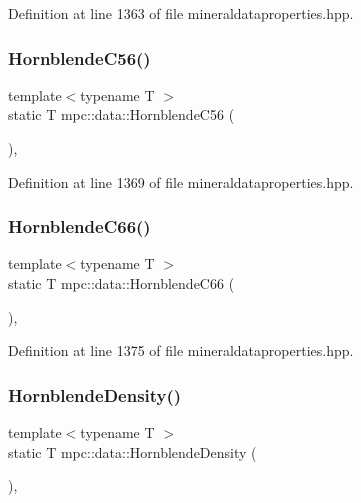 Definition at line 1363 of file mineraldataproperties.\+hpp.

\mbox{\label{namespacempc_1_1data_a4ffcdae75b9a2bb6129de78381f8be65}} 
\subsubsection{\texorpdfstring{Hornblende\+C56()}{HornblendeC56()}}
{\footnotesize\ttfamily template$<$typename T $>$ \\
static T mpc\+::data\+::\+Hornblende\+C56 (\begin{DoxyParamCaption}{ }\end{DoxyParamCaption})\hspace{0.3cm}{\ttfamily [inline]}, {\ttfamily [static]}}



Definition at line 1369 of file mineraldataproperties.\+hpp.

\mbox{\label{namespacempc_1_1data_a860769512fd43c6be02bb0b4a57c0f48}} 
\subsubsection{\texorpdfstring{Hornblende\+C66()}{HornblendeC66()}}
{\footnotesize\ttfamily template$<$typename T $>$ \\
static T mpc\+::data\+::\+Hornblende\+C66 (\begin{DoxyParamCaption}{ }\end{DoxyParamCaption})\hspace{0.3cm}{\ttfamily [inline]}, {\ttfamily [static]}}



Definition at line 1375 of file mineraldataproperties.\+hpp.

\mbox{\label{namespacempc_1_1data_a0b3ecc2ae8fd3effec8046a84a852da7}} 
\subsubsection{\texorpdfstring{Hornblende\+Density()}{HornblendeDensity()}}
{\footnotesize\ttfamily template$<$typename T $>$ \\
static T mpc\+::data\+::\+Hornblende\+Density (\begin{DoxyParamCaption}{ }\end{DoxyParamCaption})\hspace{0.3cm}{\ttfamily [inline]}, {\ttfamily [static]}}



